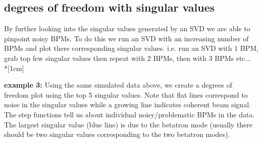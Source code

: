 \documentclass{article}
\begin{document}
{\begin{figure}[H]
\centering
{}
\caption{}
\end{figure}


\subsection{degrees of freedom with singular values}

By further looking into the singular values generated by an SVD we are able to pinpoint noisy BPMs. To do this we run an SVD with an increasing number of BPMs and plot there corresponding singular values. i.e. run an SVD with 1 BPM, grab top few singular values then repeat with 2 BPMs, then with 3 BPMs etc... \\*[1cm]

\large{\textbf{example 3:}} Using the same simulated data above, we create a degrees of freedom plot using the top 5 singular values. Note that flat lines correspond to noise in the singular values while a growing line indicates coherent beam signal. The step functions tell us about individual noisy/problematic BPMs in the data. The largest singular value (blue line) is due to the betatron mode (usually there should be two singular values corresponding to the two betatron modes).

}
\end{document}
